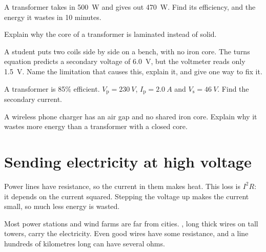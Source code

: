 \begin{quickcheck}
  \item A transformer takes in \qty{500}{W} and gives out \qty{470}{W}. Find its
        efficiency, and the energy it wastes in 10 minutes.
  \item Explain why the core of a transformer is laminated instead of
        solid.\label{ch4:qc:laminate}
  \item A student puts two coils side by side on a bench, with no iron core. The turns
        equation predicts a secondary voltage of \qty{6.0}{V}, but the voltmeter reads only
        \qty{1.5}{V}. Name the limitation that causes this, explain it, and give one way to
        fix it.
  \item A transformer is 85\% efficient. $V_\mathrm{p} = \qty{230}{V}$,
        $I_\mathrm{p} = \qty{2.0}{A}$ and $V_\mathrm{s} = \qty{46}{V}$. Find the
        secondary current.
  \item A wireless phone charger has an air gap and no shared iron core. Explain why it
        wastes more energy than a transformer with a closed core.\label{ch4:qc:wireless}
\end{quickcheck}

\section{Sending electricity at high voltage}\label{ch4:sec:transmission}

\begin{bigidea}
Power lines have resistance, so the current in them makes heat. This loss is $I^2R$: it
depends on the current squared. Stepping the voltage up makes the current small, so much
less energy is wasted.
\end{bigidea}

\begin{keywords}
\end{keywords}

Most power stations and wind farms are far from cities. , long
thick wires on tall towers, carry the electricity. Even good wires have some resistance,
and a line hundreds of kilometres long can have several ohms.

